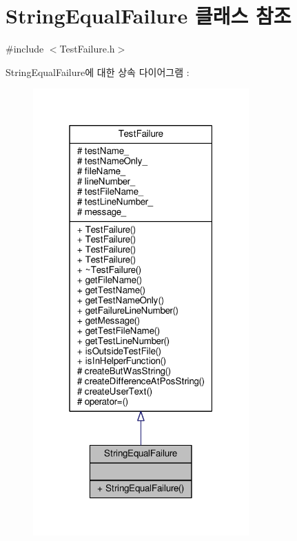 \hypertarget{class_string_equal_failure}{}\section{String\+Equal\+Failure 클래스 참조}
\label{class_string_equal_failure}


{\ttfamily \#include $<$Test\+Failure.\+h$>$}



String\+Equal\+Failure에 대한 상속 다이어그램 \+: 
\nopagebreak
\begin{figure}[H]
\begin{center}
\leavevmode
\includegraphics[width=235pt]{class_string_equal_failure__inherit__graph}
\end{center}
\end{figure}


